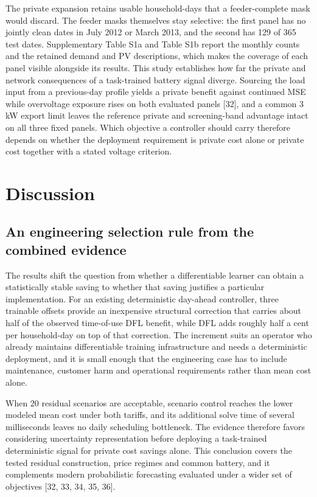 \documentclass[pdflatex,Numbered,sn-basic]{sn-jnl}
\begin{document}
The private expansion retains usable household-days that a feeder-complete mask would discard. The feeder masks themselves stay selective: the first panel has no jointly clean dates in July 2012 or March 2013, and the second has 129 of 365 test dates. Supplementary Table S1a and Table S1b report the monthly counts and the retained demand and PV descriptions, which makes the coverage of each panel visible alongside its results. This study establishes how far the private and network consequences of a task-trained battery signal diverge. Sourcing the load input from a previous-day profile yields a private benefit against continued MSE while overvoltage exposure rises on both evaluated panels [32], and a common 3 kW export limit leaves the reference private and screening-band advantage intact on all three fixed panels. Which objective a controller should carry therefore depends on whether the deployment requirement is private cost alone or private cost together with a stated voltage criterion.

\section{Discussion}

\subsection{An engineering selection rule from the combined evidence}

The results shift the question from whether a differentiable learner can obtain a statistically stable saving to whether that saving justifies a particular implementation. For an existing deterministic day-ahead controller, three trainable offsets provide an inexpensive structural correction that carries about half of the observed time-of-use DFL benefit, while DFL adds roughly half a cent per household-day on top of that correction. The increment suits an operator who already maintains differentiable training infrastructure and needs a deterministic deployment, and it is small enough that the engineering case has to include maintenance, customer harm and operational requirements rather than mean cost alone.

When 20 residual scenarios are acceptable, scenario control reaches the lower modeled mean cost under both tariffs, and its additional solve time of several milliseconds leaves no daily scheduling bottleneck. The evidence therefore favors considering uncertainty representation before deploying a task-trained deterministic signal for private cost savings alone. This conclusion covers the tested residual construction, price regimes and common battery, and it complements modern probabilistic forecasting evaluated under a wider set of objectives [32, 33, 34, 35, 36].
\end{document}
